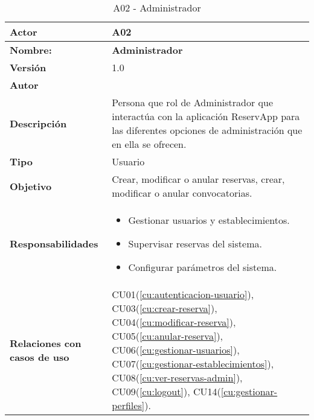 \begin{table}[H]
	\centering
	\begin{tabularx}{\linewidth}{ p{} p{} }
		\toprule
		\textbf{Actor}    & A02 \\
		\toprule
		\textbf{Nombre:} 			  & \textbf{Administrador} \\
		\textbf{Versión}              & 1.0    \\
		\textbf{Autor}                & \nombre \\
		\textbf{Descripción}          & Persona que rol de Administrador que interactúa con la aplicación ReservApp para las diferentes opciones de administración que en ella se ofrecen. \\
		\textbf{Tipo}                 & Usuario \\
		\textbf{Objetivo}             & Crear, modificar o anular reservas, crear, modificar o anular convocatorias. \\
		\textbf{Responsabilidades}    & 
		\begin{itemize}
			\tightlist
			\item Gestionar usuarios y establecimientos.
			\item Supervisar reservas del sistema.
			\item Configurar parámetros del sistema.
		\end{itemize}\\
		\textbf{Relaciones con casos de uso} & CU01(\ref{cu:autenticacion-usuario}), CU03(\ref{cu:crear-reserva}), CU04(\ref{cu:modificar-reserva}), CU05(\ref{cu:anular-reserva}), CU06(\ref{cu:gestionar-usuarios}), CU07(\ref{cu:gestionar-establecimientos}), CU08(\ref{cu:ver-reservas-admin}), CU09(\ref{cu:logout}), CU14(\ref{cu:gestionar-perfiles}). \\
		\bottomrule
	\end{tabularx}
	\caption{A02 - Administrador}
	\label{actor:administrador}
\end{table}



